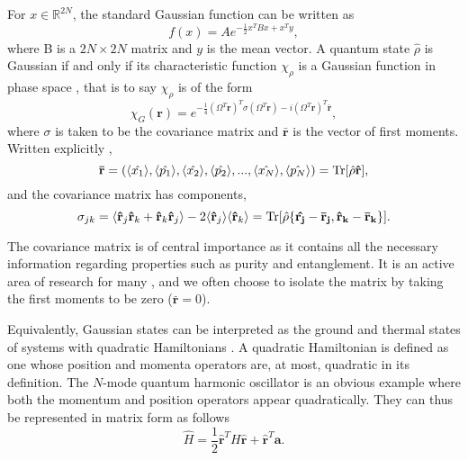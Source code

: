 \documentclass[11pt,a4paper]{article}
\numberwithin{equation}{section}
\begin{document}
	For $x \in \mathbb{R}^{2N}$, the standard Gaussian function can be written as \cite{Adesso14}
	\begin{equation} \label{eq:16}
	f(x) = Ae^{-\frac{1}{2}x^{T}Bx+ x^{T} y},
	\end{equation}
	where B is a $2N \times 2N$ matrix and $y$ is the mean vector. A quantum state $\hat{\rho}$ is Gaussian if and only if its characteristic function $\chi_\rho$ is a Gaussian function in phase space \cite{Schumaker86}, that is to say $\chi_\rho$ is of the form
	\begin{equation} \label{eq:17}
	\chi_G(\mathbf{r}) = e^{-\frac{1}{4}(\Omega^T\mathbf{r})^T\sigma(\Omega^T\mathbf{r}) - i(\Omega^T\mathbf{r})^T\mathbf{\bar{r}}},
	\end{equation} where $\sigma$ is taken to be the covariance matrix and $\mathbf{\bar{r}}$ is the vector of first moments. Written explicitly \cite{Adesso14},
	\begin{equation} \label{eq:18}
	\mathbf{\bar{r}} = (\langle\hat{x_1}\rangle, \langle\hat{p_1}\rangle, \langle\hat{x_2}\rangle, \langle\hat{p_2}\rangle, ..., \langle\hat{x_N}\rangle, \langle\hat{p_N}\rangle) = \Tr[\hat{\rho} \mathbf{\hat{r}}] ,
	\end{equation}
	and the covariance matrix has components,
	\begin{equation} \label{eq:19}
	\sigma_{jk} = \langle \mathbf{\hat{r}}_j\mathbf{\hat{r}}_k + \mathbf{\hat{r}}_k\mathbf{\hat{r}}_j \rangle - 2\langle \mathbf{\hat{r}}_j \rangle \langle \mathbf{\hat{r}}_k \rangle = \Tr[\hat{\rho} \{\mathbf{\hat{r_j}} - \mathbf{\bar{r}_j}, \mathbf{\hat{r}_k} - \mathbf{\bar{r}_k}\}].
	\end{equation}
	
	
	The covariance matrix is of central importance as it contains all the necessary information regarding properties such as purity and entanglement. It is an active area of research for many \cite{Adesso07, Plenio03}, and we often choose to isolate the matrix by taking the first moments to be zero ($\mathbf{\bar{r}} = 0$).
	
	Equivalently, Gaussian states can be interpreted as the ground and thermal states of systems with quadratic Hamiltonians \cite{Genoni16}. A quadratic Hamiltonian is defined as one whose position and momenta operators are, at most, quadratic in its definition. The $N$-mode quantum harmonic oscillator is an obvious example where both the momentum and position operators appear quadratically. They can thus be represented in matrix form as follows
	\begin{equation} \label{eq:20}
	\hat{H} = \frac{1}{2}\mathbf{\hat{r}}^{T}H\mathbf{\hat{r}}+\mathbf{\hat{r}}^{T}\mathbf{a}.
	\end{equation}
	
\end{document}
